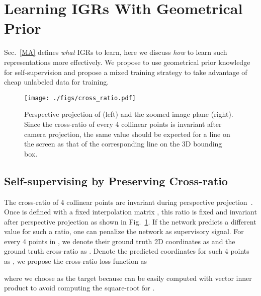 \documentclass[final]{cvpr}
\begin{document}
\section{Learning IGRs With Geometrical Prior}
\label{PI}
Sec.~\ref{MA} defines \emph{what} IGRs to learn, here we discuss \emph{how} to learn such representations more effectively. We propose to use geometrical prior knowledge for self-supervision and propose a mixed training strategy to take advantage of cheap unlabeled data for training. 
\begin{figure}[h]
	\begin{center}
		\texttt{[image: ./figs/cross\_ratio.pdf]}
	\end{center}
	\caption{Perspective projection of  (left) and the zoomed image plane (right). Since the cross-ratio of every 4 collinear points is invariant after camera projection, the same value should be expected for a line on the screen as that of the corresponding line on the 3D bounding box.}
	\label{fig:cr}
\end{figure}

\subsection{Self-supervising by Preserving Cross-ratio}
The cross-ratio of 4 collinear points are invariant during perspective projection~\cite{hartley2003multiple}. Once  is defined with a fixed interpolation matrix , this ratio is fixed and invariant after perspective projection as shown in Fig.~\ref{fig:cr}. If the network  predicts a different value for such a ratio, one can penalize the network as supervisory signal. For every 4 points in , we denote their ground truth 2D coordinates as  and the ground truth cross-ratio as . Denote the predicted coordinates for such 4 points as , we propose the cross-ratio loss function as 

where we choose  as the target because  can be easily computed with vector inner product  to avoid computing the square-root for  .
\end{document}
